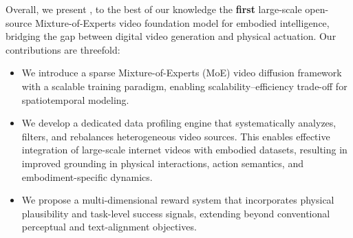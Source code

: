Overall, we present \method, to the best of our knowledge the \textbf{first} large-scale open-source Mixture-of-Experts video foundation model for embodied intelligence, bridging the gap between digital video generation and physical actuation. Our contributions are threefold:
\begin{itemize}
    \item We introduce a sparse Mixture-of-Experts (MoE) video diffusion framework with a scalable training paradigm, enabling scalability–efficiency trade-off for spatiotemporal modeling.
    \item We develop a dedicated data profiling engine that systematically analyzes, filters, and rebalances heterogeneous video sources. This enables effective integration of large-scale internet videos with embodied datasets, resulting in improved grounding in physical interactions, action semantics, and embodiment-specific dynamics.
    \item We propose a multi-dimensional reward system that incorporates physical plausibility and task-level success signals, extending beyond conventional perceptual and text-alignment objectives.
\end{itemize}
